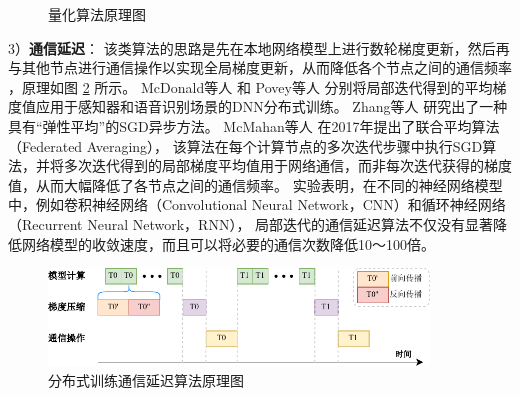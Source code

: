 \documentclass{xdupgthesis}
\begin{document}
\begin{figure}[htb]
    \centering
    \caption{量化算法原理图}
    \label{fig_Quantize}
\end{figure}

3）\textbf{通信延迟}：
该类算法的思路是先在本地网络模型上进行数轮梯度更新，然后再与其他节点进行通信操作以实现全局梯度更新，从而降低各个节点之间的通信频率 \cite{chen2018lag}，原理如图 \ref{fig_Communication} 所示。
McDonald等人 \cite{mcdonald2010distributed}和 Povey等人 \cite{povey2014parallel} 分别将局部迭代得到的平均梯度值应用于感知器和语音识别场景的DNN分布式训练。
Zhang等人 \cite{zhang2015deep}研究出了一种具有“弹性平均”的SGD异步方法。
McMahan等人 \cite{mcmahan2017communication}在2017年提出了联合平均算法（Federated Averaging），
该算法在每个计算节点的多次迭代步骤中执行SGD算法，并将多次迭代得到的局部梯度平均值用于网络通信，而非每次迭代获得的梯度值，从而大幅降低了各节点之间的通信频率。
实验表明，在不同的神经网络模型中，例如卷积神经网络（Convolutional Neural Network，CNN）和循环神经网络（Recurrent Neural Network，RNN），
局部迭代的通信延迟算法不仅没有显著降低网络模型的收敛速度，而且可以将必要的通信次数降低10～100倍。
\begin{figure}[htb]
    \centering
    \includegraphics[width=0.9\textwidth]{通信延迟原理.pdf}
    \caption{分布式训练通信延迟算法原理图}
    \label{fig_Communication}
\end{figure}
\end{document}
